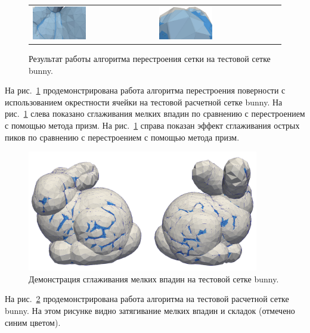 \begin{figure}[h]
\centering
\begin{tabular}{ll}
\includegraphics[width=0.45\textwidth]{./pics/text_1_remesh_common_envelope/pic_envelope_cave.png}
&
\includegraphics[width=0.45\textwidth]{./pics/text_1_remesh_common_envelope/pic_envelope_peak.png}
\end{tabular}
\singlespacing
{}\caption{Результат работы алгоритма перестроения сетки на тестовой сетке bunny.}
\label{fig:text_1_remesh3_common_envelope_bunny}
\end{figure}

На рис.~\ref{fig:text_1_remesh3_common_envelope_bunny} продемонстрирована работа алгоритма перестроения поверности с использованием окрестности ячейки на тестовой расчетной сетке bunny.
На рис.~\ref{fig:text_1_remesh3_common_envelope_bunny} слева показано сглаживания мелких впадин по сравнению с перестроением с помощью метода призм.
На рис.~\ref{fig:text_1_remesh3_common_envelope_bunny} справа показан эффект сглаживания острых пиков по сравнению с перестроением с помощью метода призм.

\begin{figure}[ht]
\centering
\includegraphics[width=0.9\textwidth]{./pics/text_1_remesh_common_envelope/bunny.png}
\singlespacing
{}\caption{Демонстрация сглаживания мелких впадин на тестовой сетке bunny.}
\label{fig:text_1_remesh3_common_envelope_bunny2}
\end{figure}

На рис.~\ref{fig:text_1_remesh3_common_envelope_bunny2} продемонстрирована работа алгоритма на тестовой расчетной сетке bunny.
На этом рисунке видно затягивание мелких впадин и складок (отмечено синим цветом).
